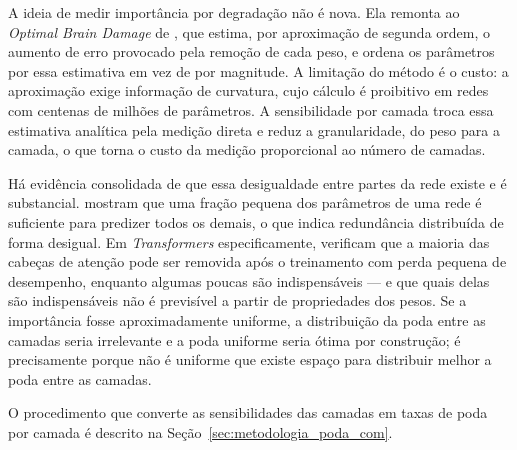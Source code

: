 A ideia de medir importância por degradação não é nova. Ela remonta ao \textit{Optimal
Brain Damage} de , que estima, por aproximação de segunda ordem, o
aumento de erro provocado pela remoção de cada peso, e ordena os parâmetros por essa
estimativa em vez de por magnitude. A limitação do método é o custo: a aproximação exige
informação de curvatura, cujo cálculo é proibitivo em redes com centenas de milhões de
parâmetros. A sensibilidade por camada troca essa estimativa analítica pela medição direta e
reduz a granularidade, do peso para a camada, o que torna o custo da medição proporcional ao
número de camadas.

Há evidência consolidada de que essa desigualdade entre partes da rede existe e é
substancial.  mostram que uma fração pequena dos parâmetros de uma
rede é suficiente para predizer todos os demais, o que indica redundância distribuída de
forma desigual. Em \textit{Transformers} especificamente, 
verificam que a maioria das cabeças de atenção pode ser removida após o treinamento com
perda pequena de desempenho, enquanto algumas poucas são indispensáveis --- e que quais
delas são indispensáveis não é previsível a partir de propriedades dos pesos. Se a
importância fosse aproximadamente uniforme, a distribuição da poda entre as camadas seria irrelevante e a
poda uniforme seria ótima por construção; é precisamente porque não é uniforme que existe
espaço para distribuir melhor a poda entre as camadas.

O procedimento que converte as sensibilidades das camadas em taxas de poda por camada é
descrito na Seção~\ref{sec:metodologia_poda_com}.


